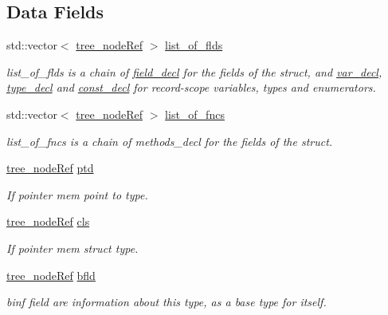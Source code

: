\subsection*{Data Fields}
\begin{DoxyCompactItemize}
\item 
std\+::vector$<$ \hyperlink{tree__node_8hpp_a6ee377554d1c4871ad66a337eaa67fd5}{tree\+\_\+node\+Ref} $>$ \hyperlink{structrecord__type_a26cc99b173912cb9022befd516559fe2}{list\+\_\+of\+\_\+flds}
\begin{DoxyCompactList}\small\item\em list\+\_\+of\+\_\+flds is a chain of \hyperlink{structfield__decl}{field\+\_\+decl} for the fields of the struct, and \hyperlink{structvar__decl}{var\+\_\+decl}, \hyperlink{structtype__decl}{type\+\_\+decl} and \hyperlink{structconst__decl}{const\+\_\+decl} for record-\/scope variables, types and enumerators. \end{DoxyCompactList}\item 
std\+::vector$<$ \hyperlink{tree__node_8hpp_a6ee377554d1c4871ad66a337eaa67fd5}{tree\+\_\+node\+Ref} $>$ \hyperlink{structrecord__type_a69ecc29c6ac8b3e1e58e6048cd421359}{list\+\_\+of\+\_\+fncs}
\begin{DoxyCompactList}\small\item\em list\+\_\+of\+\_\+fncs is a chain of methods\+\_\+decl for the fields of the struct. \end{DoxyCompactList}\item 
\hyperlink{tree__node_8hpp_a6ee377554d1c4871ad66a337eaa67fd5}{tree\+\_\+node\+Ref} \hyperlink{structrecord__type_ac0dd4d5e18c078b58506bbc8abbf1bc5}{ptd}
\begin{DoxyCompactList}\small\item\em If pointer mem point to type. \end{DoxyCompactList}\item 
\hyperlink{tree__node_8hpp_a6ee377554d1c4871ad66a337eaa67fd5}{tree\+\_\+node\+Ref} \hyperlink{structrecord__type_a4696c955c3d62ed9ce6039d51df26607}{cls}
\begin{DoxyCompactList}\small\item\em If pointer mem struct type. \end{DoxyCompactList}\item 
\hyperlink{tree__node_8hpp_a6ee377554d1c4871ad66a337eaa67fd5}{tree\+\_\+node\+Ref} \hyperlink{structrecord__type_a0a483ce49d02ad7319ebc7e5e5b2a8f6}{bfld}
\begin{DoxyCompactList}\small\item\em binf field are information about this type, as a base type for itself. \end{DoxyCompactList}\item 

\end{DoxyCompactItemize}
